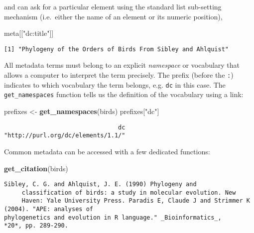 \documentclass[author-year, review, 11pt]{components/elsarticle} %
\newenvironment{Shaded}{\begin{snugshade}}{\end{snugshade}}
\newcommand{\KeywordTok}[1]{\textcolor[rgb]{0.13,0.29,0.53}{\textbf{{#1}}}}
\newcommand{\StringTok}[1]{\textcolor[rgb]{0.31,0.60,0.02}{{#1}}}
\newcommand{\NormalTok}[1]{{#1}}
\begin{document}
and can ask for a particular element using the standard list sub-setting
mechanism (i.e.~either the name of an element or its numeric position),

\begin{Shaded}
\begin{Highlighting}[]
\NormalTok{meta[[}\StringTok{"dc:title"}\NormalTok{]]}
\end{Highlighting}
\end{Shaded}

\begin{verbatim}
[1] "Phylogeny of the Orders of Birds From Sibley and Ahlquist"
\end{verbatim}

All metadata terms must belong to an explicit \emph{namespace} or
vocabulary that allows a computer to interpret the term precisely. The
prefix (before the \texttt{:}) indicates to which vocabulary the term
belongs, e.g. \texttt{dc} in this case. The \texttt{get\_namespaces}
function tells us the definition of the vocabulary using a link:

\begin{Shaded}
\begin{Highlighting}[]
\NormalTok{prefixes <-}\StringTok{ }\KeywordTok{get_namespaces}\NormalTok{(birds)}
\NormalTok{prefixes[}\StringTok{"dc"}\NormalTok{]}
\end{Highlighting}
\end{Shaded}

\begin{verbatim}
                                dc 
"http://purl.org/dc/elements/1.1/" 
\end{verbatim}

Common metadata can be accessed with a few dedicated functions:

\begin{Shaded}
\begin{Highlighting}[]
\KeywordTok{get_citation}\NormalTok{(birds)}
\end{Highlighting}
\end{Shaded}

\begin{verbatim}
Sibley, C. G. and Ahlquist, J. E. (1990) Phylogeny and
     classification of birds: a study in molecular evolution. New
     Haven: Yale University Press. Paradis E, Claude J and Strimmer K (2004). "APE: analyses of
phylogenetics and evolution in R language." _Bioinformatics_,
*20*, pp. 289-290.
\end{verbatim}
\end{document}
